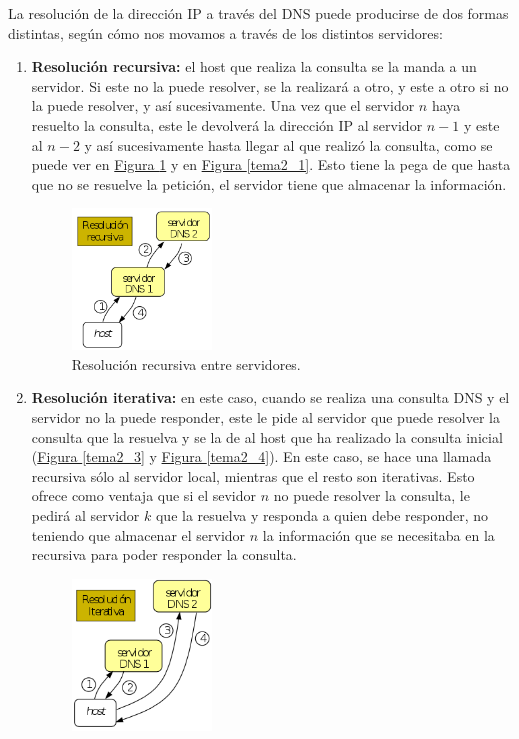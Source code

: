\documentclass[10pt,a4paper,spanish]{report}
\begin{document}
La resolución de la dirección IP a través del DNS puede producirse de dos formas distintas, según cómo nos movamos a través de los distintos servidores:
\begin{enumerate}[\color{tema2}{$\square$}]
  \item \textbf{\textcolor{tema2}{Resolución recursiva:}} el host que realiza la consulta se la manda a un servidor. Si este no la puede resolver, se la realizará a otro, y este a otro si no la puede resolver, y así sucesivamente. Una vez que el servidor $n$ haya resuelto la consulta, este le devolverá la dirección IP al servidor $n-1$ y este al $n-2$ y así sucesivamente hasta llegar al que realizó la consulta, como se puede ver en \hyperref[tema2_2]{Figura \ref*{tema2_2}} y en \hyperref[tema2_1]{Figura \ref*{tema2_1}}. Esto tiene la pega de que hasta que no se resuelve la petición, el servidor tiene que almacenar la información.
  \begin{figure}[H]
    \centering
    \includegraphics[width=0.35\textwidth]{tema2_2}
    \caption{Resolución recursiva entre servidores.}
    \label{tema2_2}
  \end{figure}
  \item \textbf{\textcolor{tema2}{Resolución iterativa:}} en este caso, cuando se realiza una consulta DNS y el servidor no la puede responder, este le pide al servidor que puede resolver la consulta que la resuelva y se la de al host que ha realizado la consulta inicial (\hyperref[tema2_3]{Figura \ref*{tema2_3}} y \hyperref[tema2_4]{Figura \ref*{tema2_4}}). En este caso, se hace una llamada recursiva sólo al servidor local, mientras que el resto son iterativas. Esto ofrece como ventaja que si el sevidor $n$ no puede resolver la consulta, le pedirá al servidor $k$ que la resuelva y responda a quien debe responder, no teniendo que almacenar el servidor $n$ la información que se necesitaba en la recursiva para poder responder la consulta. 
  \begin{figure}[H]
    \centering
    \includegraphics[width=0.35\textwidth]{tema2_3}

\end{figure}
\end{enumerate}
\end{document}
